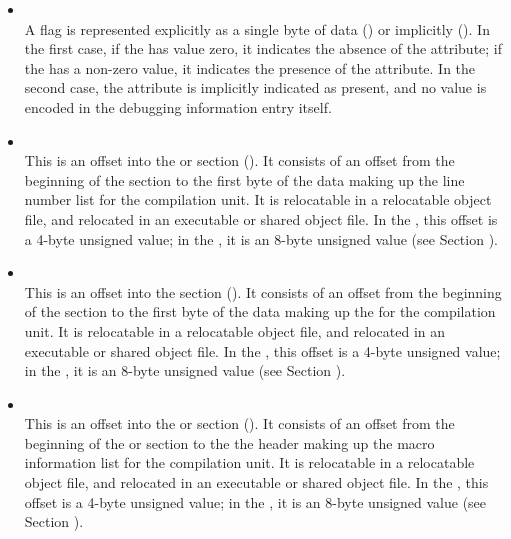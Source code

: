 \begin{itemize}
\item {} \\
A flag 
is represented explicitly as a single byte of data
(\DWFORMflagTARG) or 
implicitly (\DWFORMflagpresentTARG). 
In the
first case, if the  has value zero, it indicates the
absence of the attribute; if the  has a non-zero value,
it indicates the presence of the attribute. In the second
case, the attribute is implicitly indicated as present, and
no value is encoded in the debugging information entry itself.

\item {} \\
This is an offset into 
the 
\dotdebugline{} or \dotdebuglinedwo{} section
(\DWFORMsecoffset).
It consists of an offset from the beginning of the 
\dotdebugline{}
section to the first byte of
the data making up the line number list for the compilation
unit. 
It is relocatable in a relocatable object file, and
relocated in an executable or shared object file. In the 
\thirtytwobitdwarfformat, this offset is a 4-byte unsigned value;
in the \sixtyfourbitdwarfformat, it is an 8-byte unsigned value
(see Section ).


\item {} \\
This is an offset into the 
\dotdebugloc{}
section
(\DWFORMsecoffset). 
It consists of an offset from the
beginning of the 
\dotdebugloc{}
section to the first byte of
the data making up the 
 for the compilation unit. 
It is relocatable in a relocatable object file, and
relocated in an executable or shared object file. In the 
\thirtytwobitdwarfformat, this offset is a 4-byte unsigned value;
in the \sixtyfourbitdwarfformat, it is an 8-byte unsigned value
(see Section ).


\item {} \\
This is an 
offset into the 
\dotdebugmacro{} or \dotdebugmacrodwo{} section
(\DWFORMsecoffset). 
It consists of an offset from the beginning of the 
\dotdebugmacro{} or \dotdebugmacrodwo{} 
section to the the header making up the 
macro information list for the compilation unit. 
It is relocatable in a relocatable object file, and
relocated in an executable or shared object file. In the 
\thirtytwobitdwarfformat, this offset is a 4-byte unsigned value;
in the \sixtyfourbitdwarfformat, it is an 8-byte unsigned value
(see Section ).


\end{itemize}

